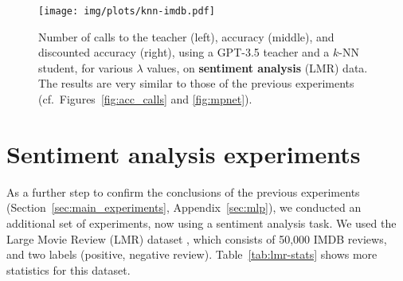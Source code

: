 \documentclass[11pt]{article}
\begin{document}
\begin{figure*}[!t]
\centering
{
    \texttt{[image: img/plots/knn-imdb.pdf]}
    \vspace{-4mm}
    \caption{
    Number of calls to the teacher (left),  accuracy (middle), and discounted accuracy (right), using a GPT-3.5 teacher and a $k$-NN student, for various $\lambda$ values, on \textbf{sentiment analysis} (LMR) data. The results are very similar to those of the previous experiments (cf.\ Figures~\ref{fig:acc_calls} and \ref{fig:mpnet}).}
    \label{fig:knn-imdb}
}
\end{figure*}

\section{Sentiment analysis experiments}
\label{sec:sentiment}

As a further step to confirm the conclusions of the previous experiments (Section~\ref{sec:main_experiments}, Appendix~\ref{sec:mlp}), 
we conducted an additional set of experiments, now using a sentiment analysis task.
We used the Large Movie Review (LMR) dataset \cite{maas-EtAl:2011:ACL-HLT2011}, which consists of 50,000 IMDB reviews, and two labels (positive, negative review). Table~\ref{tab:lmr-stats} shows more statistics for this dataset.
\end{document}

